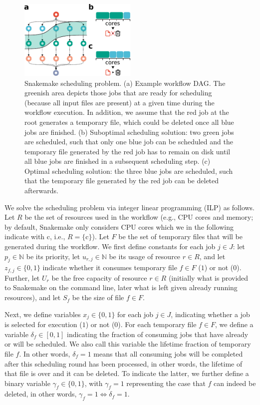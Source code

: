 \documentclass[parskip=half]{scrartcl}
\begin{document}
\begin{figure}
	\centering
	\includegraphics[width=0.5\textwidth]{scheduling.pdf}
	\caption{Snakemake scheduling problem. (a) Example workflow DAG.
		The greenish area depicts those jobs that are ready for scheduling (because all input files are present) at a given time during the workflow execution.
		In addition, we assume that the red job at the root generates a temporary file, which could be deleted once all blue jobs are finished.
		(b) Suboptimal scheduling solution: two green jobs are scheduled, such that only one blue job can be scheduled and the temporary file generated by the red job has to remain on disk until all blue jobs are finished in a subsequent scheduling step. (c) Optimal scheduling solution: the three blue jobs are scheduled, such that the temporary file generated by the red job can be deleted afterwards.}\label{fig:scheduling}
\end{figure}

\newcommand{\N}{\mathbb{N}}
\newcommand{\cores}{\text{c}}

We solve the scheduling problem via integer linear programming (ILP) as follows.
Let $R$ be the set of resources used in the workflow (e.g., CPU cores and memory; by default, Snakemake only considers CPU cores which we in the following indicate with $\cores$, i.e., $R = \{\cores\}$).
Let $F$ be the set of temporary files that will be generated during the workflow.
We first define constants for each job $j \in J$: let $p_j \in \N$ be its priority, let $u_{r,j} \in \N$ be its usage of resource $r \in R$, and let $z_{f,j} \in \{0,1\}$ indicate whether it consumes temporary file $f \in F$ ($1$) or not ($0$).
Further, let $U_r$ be the free capacity of resource $r \in R$ (initially what is provided to Snakemake on the command line, later what is left given already running resources), and let $S_f$ be the size of file $f \in F$.

Next, we define variables $x_j \in \{0,1\}$ for each job $j \in J$, indicating whether a job is selected for execution ($1$) or not ($0$).
For each temporary file $f \in F$, we define a variable $\delta_f \in [0,1]$ indicating the fraction of consuming jobs that have already or will be scheduled.
We also call this variable the lifetime fraction of temporary file $f$.
In other words, $\delta_f = 1$ means that all consuming jobs will be completed after this scheduling round has been processed, in other words, the lifetime of that file is over and it can be deleted.
To indicate the latter, we further define a binary variable $\gamma_f \in \{0,1\}$, with $\gamma_f = 1$ representing the case that $f$ can indeed be deleted, in other words, $\gamma_f = 1 \Leftrightarrow \delta_f = 1$.
\end{document}
